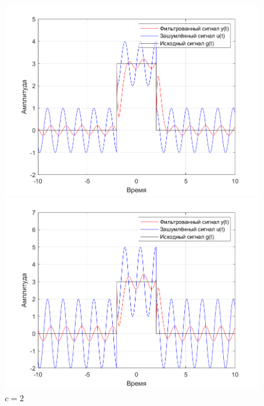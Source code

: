 \documentclass[a4paper]{article}
\begin{document}
\begin{figure}[H]
    \begin{minipage}{0.5\textwidth}
        \centering
        \includegraphics[width=\linewidth]{ex1_2/a1=0_a2=25_b1=10.5_b2=25_d=4_c=1/h2.png}
        \caption{$c=1$}
    \end{minipage}
    \begin{minipage}{0.5\textwidth}
        \centering
        \includegraphics[width=\linewidth]{ex1_2/a1=0_a2=25_b1=10.5_b2=25_d=4_c=2/h2.png}
        \caption{$c=2$}
    \end{minipage}
\end{figure}
\end{document}

